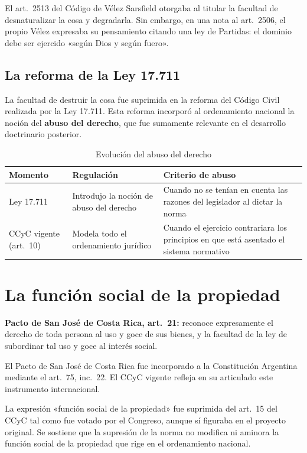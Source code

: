 \documentclass[12pt,oneside]{book}
\begin{document}
El art.~2513 del Código de Vélez Sarsfield otorgaba al titular la facultad de desnaturalizar la cosa y degradarla. Sin embargo, en una nota al art.~2506, el propio Vélez expresaba su pensamiento citando una ley de Partidas: el dominio debe ser ejercido «según Dios y según fuero».

\subsection{La reforma de la Ley 17.711}

La facultad de destruir la cosa fue suprimida en la reforma del Código Civil realizada por la Ley 17.711. Esta reforma incorporó al ordenamiento nacional la noción del \textbf{abuso del derecho}, que fue sumamente relevante en el desarrollo doctrinario posterior.

\begin{table}[H]
\centering
\caption{Evolución del abuso del derecho}
\small
\begin{tabularx}{\textwidth}{
    >{\raggedright\arraybackslash}p{}
    >{\raggedright\arraybackslash}X
    >{\raggedright\arraybackslash}X
}
\toprule
\textbf{Momento} & \textbf{Regulación} & \textbf{Criterio de abuso} \\
\midrule
Ley 17.711 & Introdujo la noción de abuso del derecho & Cuando no se tenían en cuenta las razones del legislador al dictar la norma \\
CCyC vigente (art.~10) & Modela todo el ordenamiento jurídico & Cuando el ejercicio contrariara los principios en que está asentado el sistema normativo \\
\bottomrule
\end{tabularx}
\end{table}

\section{La función social de la propiedad}

\textbf{Pacto de San José de Costa Rica, art.~21:} reconoce expresamente el derecho de toda persona al uso y goce de sus bienes, y la facultad de la ley de subordinar tal uso y goce al interés social.

El Pacto de San José de Costa Rica fue incorporado a la Constitución Argentina mediante el art.~75, inc.~22. El CCyC vigente refleja en su articulado este instrumento internacional.

La expresión «función social de la propiedad» fue suprimida del art.~15 del CCyC tal como fue votado por el Congreso, aunque sí figuraba en el proyecto original. Se sostiene que la supresión de la norma no modifica ni aminora la función social de la propiedad que rige en el ordenamiento nacional.
\end{document}
